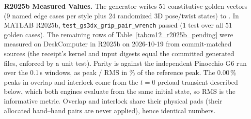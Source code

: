 \documentclass[11pt,a4paper]{article}
\begin{document}
\textbf{R2025b Measured Values.}
The generator writes $51$ constitutive golden vectors ($9$ named edge cases per style plus $24$ randomized 3D pose/twist states) to . In MATLAB R2025b, \texttt{test\_gs3dx\_grip\_pair\_wrench} passed ($1$ test over all $51$ golden cases). The remaining rows of Table~\ref{tab:m12_r2025b_pending} were measured on DeskComputer in R2025b on 2026-10-19 from commit-matched sources (the receipt's kernel and input digests equal the committed generated files, enforced by a unit test). Parity is against the independent Pinocchio G6 run over the 0.1\,s windows, as peak / RMS in \% of the reference peak. The 0.00\,\% peaks in overlap and interlock come from the $t = 0$ preload transient described below, which both engines evaluate from the same initial state, so RMS is the informative metric. Overlap and interlock share their physical pads (their allocated hand--hand pairs are never applied), hence identical numbers.
\end{document}
